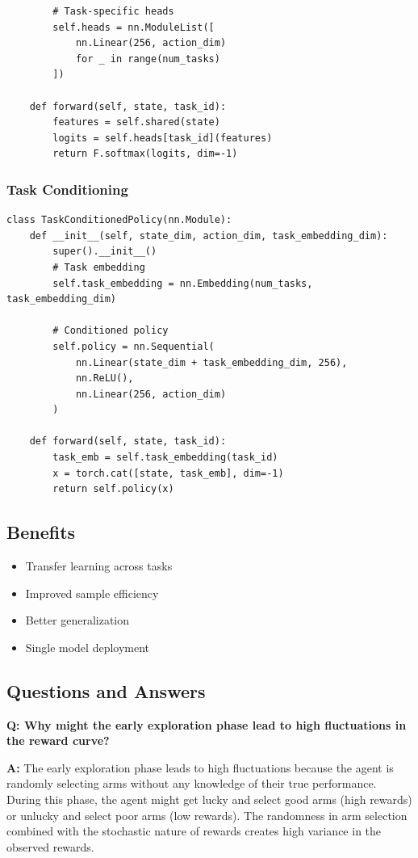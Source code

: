 \documentclass[12pt]{article}
\begin{document}
{{{\begin{verbatim}
        # Task-specific heads
        self.heads = nn.ModuleList([
            nn.Linear(256, action_dim) 
            for _ in range(num_tasks)
        ])
    
    def forward(self, state, task_id):
        features = self.shared(state)
        logits = self.heads[task_id](features)
        return F.softmax(logits, dim=-1)
\end{verbatim}

\subsubsection{Task Conditioning}

\begin{verbatim}
class TaskConditionedPolicy(nn.Module):
    def __init__(self, state_dim, action_dim, task_embedding_dim):
        super().__init__()
        # Task embedding
        self.task_embedding = nn.Embedding(num_tasks, task_embedding_dim)
        
        # Conditioned policy
        self.policy = nn.Sequential(
            nn.Linear(state_dim + task_embedding_dim, 256),
            nn.ReLU(),
            nn.Linear(256, action_dim)
        )
    
    def forward(self, state, task_id):
        task_emb = self.task_embedding(task_id)
        x = torch.cat([state, task_emb], dim=-1)
        return self.policy(x)
\end{verbatim}

\subsection{Benefits}

\begin{itemize}
\item Transfer learning across tasks
\item Improved sample efficiency
\item Better generalization
\item Single model deployment
\end{itemize}

\subsection{Questions and Answers}

\textbf{Q: Why might the early exploration phase lead to high fluctuations in the reward curve?}

\textbf{A:} The early exploration phase leads to high fluctuations because the agent is randomly selecting arms without any knowledge of their true performance. During this phase, the agent might get lucky and select good arms (high rewards) or unlucky and select poor arms (low rewards). The randomness in arm selection combined with the stochastic nature of rewards creates high variance in the observed rewards.

}}}
\end{document}
